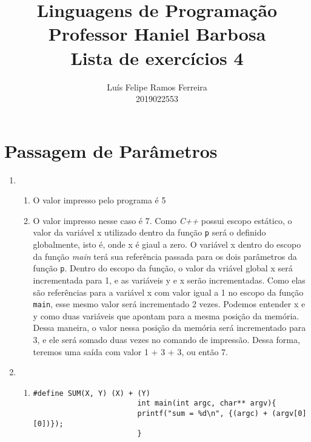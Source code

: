 \documentclass{article}
\title{Linguagens de Programação \\ Professor Haniel Barbosa \\ Lista de
    exercícios 4}
\author{Luís Felipe Ramos Ferreira \\ 2019022553}
\begin{document}
\maketitle

\section{Passagem de Parâmetros}
\begin{enumerate}
    \item
          \begin{enumerate}[label = (\alph*)]
              \item
                    O valor impresso pelo programa é 5
              \item
                    O valor impresso nesse caso é 7. Como \textit{C++} possui
                    escopo estático,
                    o valor da variável x utilizado dentro da função \texttt{p}
                    será o definido globalmente, isto é,
                    onde x é giaul a zero. O variável x dentro do escopo da
                    função \textit{main} terá sua referência
                    passada para os dois parâmetros da função \texttt{p}.
                    Dentro do escopo da função, o valor da vriável global
                    x será incrementada para 1, e as variáveis y e x serão
                    incrementadas. Como elas são referências para a variável x
                    com
                    valor igual a 1 no escopo da função \texttt{main}, esse
                    mesmo valor será incrementado 2 vezes. Podemos entender x e
                    y
                    como duas variáveis que apontam para a mesma posição da
                    memória. Dessa maneira, o valor nessa posição da memória
                    será incrementado
                    para 3, e ele será somado duas vezes no comando de
                    impressão. Dessa forma, teremos uma saída com valor 1 + 3 +
                    3, ou então 7.
          \end{enumerate}
    \item
          \begin{enumerate}[label = (\alph*)]
              \item
                    \begin{lstlisting}[style=CStyle]
                        #define SUM(X, Y) (X) + (Y)
                        int main(int argc, char** argv){
                        printf("sum = %d\n", {(argc) + (argv[0][0])}); 
                        }

\end{lstlisting}
\end{enumerate}
\end{enumerate}
\end{document}
